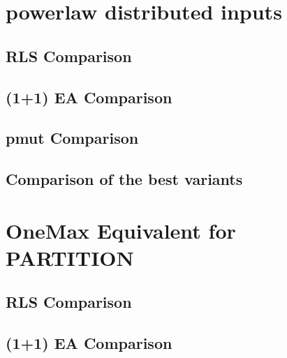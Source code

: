 
\section{powerlaw distributed inputs}

\subsection{RLS Comparison}





\subsection{(1+1) EA Comparison}





\subsection{pmut Comparison}





\subsection{Comparison of the best variants}





\section{OneMax Equivalent for PARTITION}

\subsection{RLS Comparison}





\subsection{(1+1) EA Comparison}


